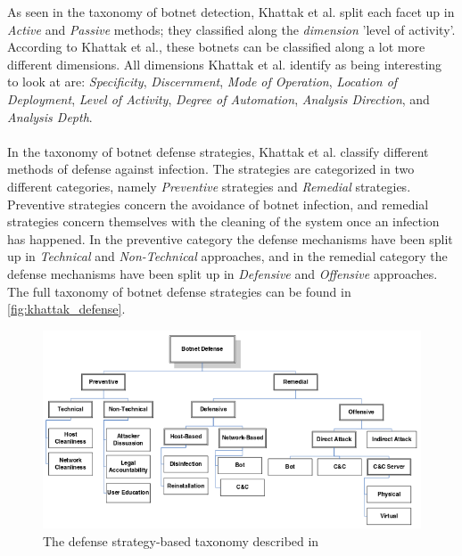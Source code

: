 \documentclass[a4paper,10pt]{article}
\begin{document}
\noindent As seen in the taxonomy of botnet detection, Khattak et al. split each facet up in \textit{Active} and \textit{Passive}
methods; they classified along the \textit{dimension} 'level of activity'. According to Khattak et al., these botnets can be
classified along a lot more different dimensions. All dimensions Khattak et al. identify as being interesting to look at
are: \textit{Specificity}, \textit{Discernment}, \textit{Mode of Operation}, \textit{Location of Deployment}, \textit{Level of
Activity}, \textit{Degree of Automation}, \textit{Analysis Direction}, and \textit{Analysis Depth}.
\\\\
In the taxonomy of botnet defense strategies, Khattak et al. classify different methods of defense against infection.
The strategies are categorized in two different categories, namely \textit{Preventive} strategies and \textit{Remedial}
strategies. Preventive strategies concern the avoidance of botnet infection, and remedial strategies concern themselves
with the cleaning of the system once an infection has happened. In the preventive category the defense mechanisms have
been split up in \textit{Technical} and \textit{Non-Technical} approaches, and in the remedial category the defense mechanisms
have been split up in \textit{Defensive} and \textit{Offensive} approaches. The full taxonomy of botnet defense strategies can 
be found in \autoref{fig:khattak_defense}.
\\
\begin{figure}[hbtp]
 \centering
 \includegraphics[width=0.9\linewidth]{khattak-defense.png}
 \caption{The defense strategy-based taxonomy described in \cite{Khattak2014}}
 \label{fig:khattak_defense}
\end{figure}
\end{document}
